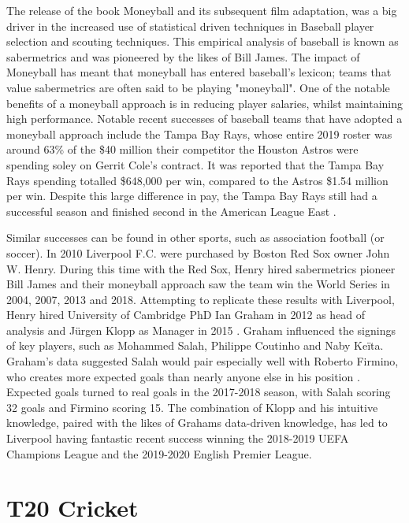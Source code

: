\documentclass[12pt,a4paper]{report}
\theoremstyle{definition}
\begin{document}
The release of the book Moneyball \citep{Moneyball2004} and its subsequent film adaptation, was a big driver in the increased use of statistical driven techniques in Baseball player selection and scouting techniques. 
This empirical analysis of baseball is known as sabermetrics and was pioneered by the likes of Bill James.
The impact of Moneyball has meant that moneyball has entered baseball's lexicon; teams that value sabermetrics are often said to be playing "moneyball".  
One of the notable benefits of a moneyball approach is in reducing player salaries, whilst maintaining high performance. 
Notable recent successes of baseball teams that have adopted a moneyball approach include the Tampa Bay Rays, whose entire 2019 roster was around 63\% of the \$40 million their competitor the Houston Astros were spending soley on Gerrit Cole's contract. 
It was reported that the Tampa Bay Rays spending totalled \$648,000 per win, compared to the Astros \$1.54 million per win.
Despite this large difference in pay, the Tampa Bay Rays still had a successful season and finished second in the American League East \citep{Fox2019}.

Similar successes can be found in other sports, such as association football (or soccer). 
In 2010 Liverpool F.C. were purchased by Boston Red Sox owner John W. Henry. 
During this time with the Red Sox, Henry hired sabermetrics pioneer Bill James and their moneyball approach saw the team win the World Series in 2004, 2007, 2013 and 2018. 
Attempting to replicate these results with Liverpool, Henry hired University of Cambridge PhD Ian Graham in 2012 as head of analysis and J\"urgen Klopp as Manager in 2015 \citep{Liverpool2022}. 
Graham influenced the signings of key players, such as Mohammed Salah, Philippe Coutinho and Naby Ke\"ita. 
Graham's data suggested Salah would pair especially well with Roberto Firmino, who creates more expected goals than nearly anyone else in his position \citep{Liverpool2019}. 
Expected goals turned to real goals in the 2017-2018 season, with Salah scoring 32 goals and Firmino scoring 15. 
The combination of Klopp and his intuitive knowledge, paired with the likes of Grahams data-driven knowledge, has led to Liverpool having fantastic recent success winning the 2018-2019 UEFA Champions League and the 2019-2020 English Premier League.

\section{T20 Cricket} \label{sec:T20Cricket}
\end{document}

